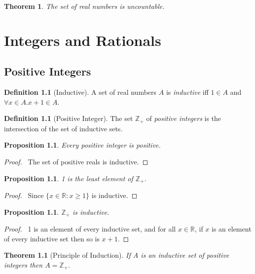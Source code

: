 \documentclass{book}
\let\qed\relax
\newtheorem{prop}[ax]{Proposition}
\newtheorem{thm}[ax]{Theorem}
\theoremstyle{definition}
\newtheorem{df}[ax]{Definition}
\begin{document}
\begin{thm}
The set of real numbers is uncountable.
\end{thm}

\chapter{Integers and Rationals}

\section{Positive Integers}

\begin{df}[Inductive]
A set of real numbers $A$ is \emph{inductive} iff $1 \in A$ and $\forall x \in A. x + 1 \in A$.
\end{df}

\begin{df}[Positive Integer]
The set $\mathbb{Z}_+$ of \emph{positive integers} is the intersection of the set of inductive sets.
\end{df}

\begin{prop}
Every positive integer is positive.
\end{prop}

\begin{proof}
\pf\ The set of positive reals is inductive. \qed
\end{proof}

\begin{prop}
1 is the least element of $\mathbb{Z}_+$.
\end{prop}

\begin{proof}
\pf\ Since $\{ x \in \mathbb{R} : x \geq 1 \}$ is inductive. \qed
\end{proof}

\begin{prop}
$\mathbb{Z}_+$ is inductive.
\end{prop}

\begin{proof}
\pf\ 1 is an element of every inductive set, and for all $x \in \mathbb{R}$, if $x$ is an element of every inductive set then so is $x + 1$. \qed
\end{proof}

\begin{thm}[Principle of Induction]
If $A$ is an inductive set of positive integers then $A = \mathbb{Z}_+$.
\end{thm}
\end{document}
